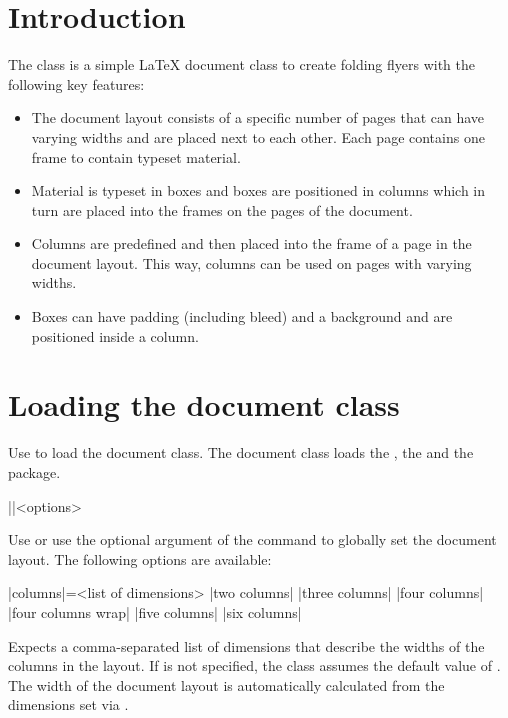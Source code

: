 \documentclass[a4paper]{article}
\begin{document}
\printdoctitle
\bigskip

\section{Introduction}

The  class is a simple LaTeX document class to create folding flyers with the following key features:

\begin{itemize}
  \item The document layout consists of a specific number of pages that can have varying widths and are placed next to each other. Each page contains one frame to contain typeset material.
  \item Material is typeset in boxes and boxes are positioned in columns which in turn are placed into the frames on the pages of the document.
  \item Columns are predefined and then placed into the frame of a page in the document layout. This way, columns can be used on pages with varying widths.
  \item Boxes can have padding (including bleed) and a background and are positioned inside a column.
\end{itemize}

\section{Loading the document class}

Use  to load the document class. The document class loads the , the  and the  package.

\begin{macrodef}
|\leporelloset|{<options>}
\end{macrodef}
Use \macro{\leporelloset} or use the optional argument of the \macro{\documentclass} command to globally set the document layout. The following options are available:

\begin{macrodef}
|columns|={<list of dimensions>}
|two columns|
|three columns|
|four columns|
|four columns wrap|
|five columns|
|six columns|
\end{macrodef}
Expects a comma-separated list of dimensions that describe the widths of the columns in the layout. If  is not specified, the class assumes the default value of \macro{97mm, 100mm, 100mm}. The width of the document layout is automatically calculated from the dimensions set via .
\end{document}
